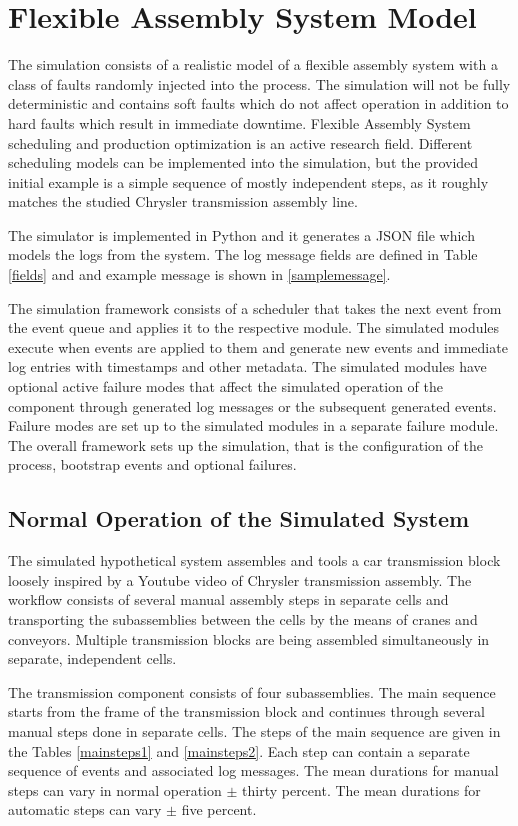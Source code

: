 \documentclass[journal]{IEEEtran}
\begin{document}
\section{Flexible Assembly System Model}

The simulation consists of a realistic model of a flexible assembly system with a class of faults randomly injected into the process.
The simulation will not be fully deterministic and contains soft faults which do not affect operation in addition to hard faults which result in immediate downtime.
Flexible Assembly System scheduling and production optimization is an active research field. Different scheduling models can be implemented into the simulation,
but the provided initial example is a simple sequence of mostly independent steps, as it roughly matches the studied Chrysler transmission assembly line.

The simulator is implemented in Python and it generates a JSON file which models the logs from the system. The log message fields are defined in Table \ref{fields} and
and example message is shown in \ref{samplemessage}.

The simulation framework consists of a scheduler that takes the next event from the event queue and applies it to the respective module. The simulated modules
execute when events are applied to them and generate new events and immediate log entries with timestamps and other metadata.
The simulated modules have optional active failure modes that affect the simulated operation of the component through
generated log messages or the subsequent generated events. Failure modes are set up to the simulated modules in a separate failure module.
The overall framework sets up the simulation, that is the configuration of the process, bootstrap events and optional failures.

\subsection{Normal Operation of the Simulated System}
The simulated hypothetical system assembles and tools a car transmission block loosely inspired by a Youtube video of Chrysler transmission assembly\cite{transmission}.
The workflow consists of several manual assembly steps in separate cells and transporting the subassemblies between the cells by the means of
cranes and conveyors. Multiple transmission blocks are being assembled simultaneously in separate, independent cells.

The transmission component consists of four subassemblies. The main sequence starts from the frame of the transmission block
and continues through several manual steps done in separate cells. The steps of the main sequence are given in
the Tables \ref{mainsteps1} and \ref{mainsteps2}.
Each step can contain a separate sequence of events and associated log messages.
The mean durations for manual steps can vary in normal operation $\pm$ thirty percent. The mean durations for automatic steps can vary
$\pm$ five percent.
\end{document}
